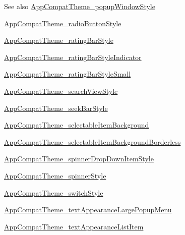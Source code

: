 \begin{DoxySeeAlso}{See also}
\hyperlink{classandroid_1_1support_1_1v7_1_1cardview_1_1R_1_1styleable_a6bbd99358284cc2f4f173afb1fe1bd7c}{App\+Compat\+Theme\+\_\+popup\+Window\+Style} 

\hyperlink{classandroid_1_1support_1_1v7_1_1cardview_1_1R_1_1styleable_a7ff022a059deabbb175cc243b5ea6c68}{App\+Compat\+Theme\+\_\+radio\+Button\+Style} 

\hyperlink{classandroid_1_1support_1_1v7_1_1cardview_1_1R_1_1styleable_a80912800f5da21eb5d311d314e104c2a}{App\+Compat\+Theme\+\_\+rating\+Bar\+Style} 

\hyperlink{classandroid_1_1support_1_1v7_1_1cardview_1_1R_1_1styleable_a3224ccfc3225c5afe3441f7efca1270c}{App\+Compat\+Theme\+\_\+rating\+Bar\+Style\+Indicator} 

\hyperlink{classandroid_1_1support_1_1v7_1_1cardview_1_1R_1_1styleable_af7fad53bb6f6481db350fa6bf3d2f4be}{App\+Compat\+Theme\+\_\+rating\+Bar\+Style\+Small} 

\hyperlink{classandroid_1_1support_1_1v7_1_1cardview_1_1R_1_1styleable_a71e0ea183bad4ce323aadbefc4dd0910}{App\+Compat\+Theme\+\_\+search\+View\+Style} 

\hyperlink{classandroid_1_1support_1_1v7_1_1cardview_1_1R_1_1styleable_a2fa09f08a3cd57107f1bbb78f73175ce}{App\+Compat\+Theme\+\_\+seek\+Bar\+Style} 

\hyperlink{classandroid_1_1support_1_1v7_1_1cardview_1_1R_1_1styleable_add903683547560a9e09d1884a4359c03}{App\+Compat\+Theme\+\_\+selectable\+Item\+Background} 

\hyperlink{classandroid_1_1support_1_1v7_1_1cardview_1_1R_1_1styleable_a2515e8712f0532b1b2f41d046b23ac29}{App\+Compat\+Theme\+\_\+selectable\+Item\+Background\+Borderless} 

\hyperlink{classandroid_1_1support_1_1v7_1_1cardview_1_1R_1_1styleable_a62e180c1f60defc3fbbb0ef9727b592e}{App\+Compat\+Theme\+\_\+spinner\+Drop\+Down\+Item\+Style} 

\hyperlink{classandroid_1_1support_1_1v7_1_1cardview_1_1R_1_1styleable_a79aca90da3f26ef28ad85f5c155d9b49}{App\+Compat\+Theme\+\_\+spinner\+Style} 

\hyperlink{classandroid_1_1support_1_1v7_1_1cardview_1_1R_1_1styleable_ae03f65b3221dfdd71687a7d31d9a7103}{App\+Compat\+Theme\+\_\+switch\+Style} 

\hyperlink{classandroid_1_1support_1_1v7_1_1cardview_1_1R_1_1styleable_afe291a8800123e67953b2ed9511c4a9a}{App\+Compat\+Theme\+\_\+text\+Appearance\+Large\+Popup\+Menu} 

\hyperlink{classandroid_1_1support_1_1v7_1_1cardview_1_1R_1_1styleable_a8f72667dec9ee05cdbf2e2619848768c}{App\+Compat\+Theme\+\_\+text\+Appearance\+List\+Item} 


\end{DoxySeeAlso}
